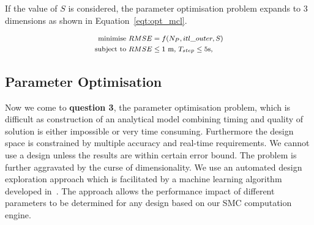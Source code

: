 If the value of $S$ is considered, the parameter optimisation problem expands to 3 dimensions as shown in Equation~\ref{eqt:opt_mcl}.

\begin{equation}
\footnotesize
\begin{aligned}
\mbox{minimise } RMSE &= f(N_P, itl\_outer, S) \\
\mbox{subject to } RMSE & \leq \mbox{1 m, } T_{step} \leq \mbox{5s, } \\
\end{aligned}
\label{eqt:opt_mcl}
\end{equation}



\subsection{Parameter Optimisation}
\label{sec:dse}

Now we come to \textbf{question 3}, the parameter optimisation problem, which is difficult as construction of an analytical model combining timing and quality of solution is either impossible or very time consuming. 
Furthermore the design space is constrained by multiple accuracy and real-time requirements.
We cannot use a design unless the results are within certain error bound.
The problem is further aggravated by the curse of dimensionality.
We use an automated design exploration approach which is facilitated by a machine learning algorithm developed in~\cite{kurek14}.
The approach allows the performance impact of different parameters to be determined for any design based on our SMC computation engine. 

